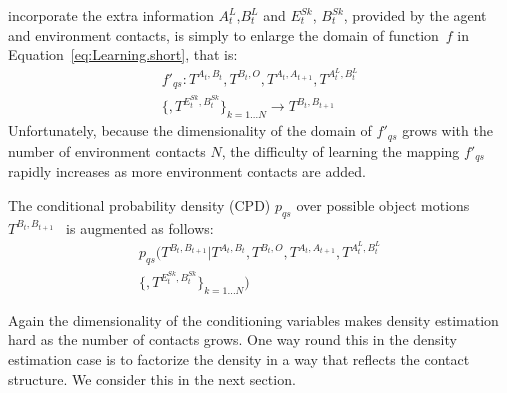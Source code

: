incorporate the extra information $A^{L}_{t}$,$B^{L}_{t}$ and
$E^{Sk}_t$\hspace{-6pt}, $B^{Sk}_t$, provided by the agent and
environment contacts, is simply to enlarge the domain of function~$f$
in Equation~\eqref{eq:Learning.short}, that is:
\begin{multline}
f'_{qs}: T^{A_t, B_t}, T^{B_t, O}, T^{A_{t}, A_{t+1}}, T^{A^{L}_t, B^{L}_t} \\ \{, T^{E^{Sk}_t,B^{Sk}_t}\}_{k=1 \ldots N} \longrightarrow T^{B_{t}, B_{t+1}}
\label{eq:Learning.augmented}
\end{multline}
\noindent Unfortunately, because the dimensionality of the domain of $f'_{qs}$ grows with the number of environment contacts $N$,
the difficulty of learning the mapping $f'_{qs}$ rapidly increases
as more environment contacts are added.

The conditional probability density (CPD) $p_{qs}$ over possible object motions $T^{B_{t}, B_{t+1}}$~\citep{kopicki_prediction_2009} is augmented as follows:
\begin{multline}
p_{qs}(T^{B_{t}, B_{t+1}} | T^{A_t, B_t}, T^{B_t, O}, T^{A_{t}, A_{t+1}}, T^{A^{L}_t, B^{L}_t} \\ \{, T^{E^{Sk}_t,B^{Sk}_t}\}_{k=1 \ldots N})
\label{eq:Learning.density}
\end{multline}

Again the dimensionality of the conditioning variables makes density
estimation hard as the number of contacts grows. One way round this in the density estimation case is to factorize the density in a way that
reflects the contact structure. We consider this in the next section. 